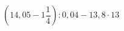 \begin{ex}[type=calculate]
	\begin{condition}
		\( \left( 14,05-1\dfrac{1}{4} \right):0,04-13,8\cdot13 \)
	\end{condition}
	\answer{}
\end{ex}